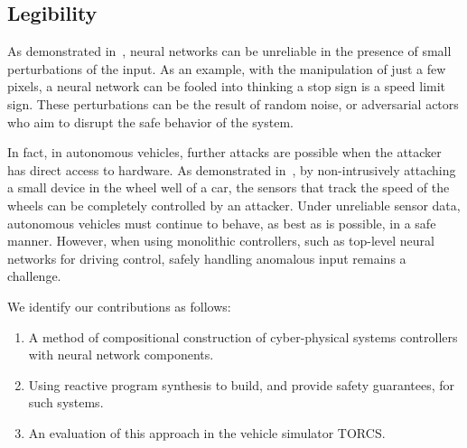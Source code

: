 \subsection{Legibility}

As demonstrated in~\cite{DBLP:journals/corr/SzegedyZSBEGF13}, neural networks can be unreliable in the presence of small perturbations of the input.
As an example, with the manipulation of just a few pixels, a neural network can be fooled into thinking a stop sign is a speed limit sign.
These perturbations can be the result of random noise, or adversarial actors who aim to disrupt the safe behavior of the system.

In fact, in autonomous vehicles, further attacks are possible when the attacker has direct access to hardware.
As demonstrated in~\cite{DBLP:journals/iacr/Shoukry0TS15}, by non-intrusively attaching a small device in the wheel well of a car, the sensors that track the speed of the wheels can be completely controlled by an attacker.
Under unreliable sensor data, autonomous vehicles must continue to behave, as best as is possible, in a safe manner.
However, when using monolithic controllers, such as top-level neural networks for driving control, safely handling anomalous input remains a challenge.

We identify our contributions as follows:
\begin{enumerate}
\item A method of compositional construction of cyber-physical systems controllers with neural network components.
\item Using reactive program synthesis to build, and provide safety guarantees, for such systems.
\item An evaluation of this approach in the vehicle simulator TORCS.
\end{enumerate}


